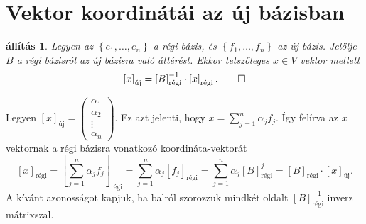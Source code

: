 \documentclass[9pt, a4paper, showtrims]{memoir}
\makeatletter
\renewenvironment{proof}[1][\proofname]
    {\par\pushQED{\qed}%
    \normalfont \topsep6\p@\@plus6\p@\relax
    \trivlist
    \item[\hskip\labelsep
        \itshape
    #1\@addpunct{:}]\ignorespaces}
    {\popQED\endtrivlist\@endpefalse}
\theoremstyle{plain}
\newtheorem{proposition}{állítás}[chapter]
\theoremstyle{remark}
\theoremstyle{definition}
\newcommand{\uj}{\text{új}}
\newcommand{\rgi}{\text{régi}}
\makeatother
\begin{document}
\section{Vektor koordinátái az új bázisban}
\begin{proposition}
	Legyen az $\left\{ e_1,\ldots,e_n \right\}$ a régi bázis,
	és $\left\{ f_1,\ldots,f_n \right\}$ az új bázis.
	Jelölje $B$ a régi bázisról az új bázisra való áttérést.
	Ekkor tetszőleges $x\in V$ vektor mellett
	\[
		\left[ x \right]_\uj
		=
		\left[ B \right]_\rgi^{-1}
		\cdot
		\left[ x \right]_\rgi.\qedhere
	\]
\end{proposition}
\begin{proof}
	Legyen
	$
		\left[ x \right]_\uj
		=
		\begin{pmatrix}
			\alpha_1 \\ \alpha_2 \\ \vdots \\ \alpha_n
		\end{pmatrix}.
	$
	Ez azt jelenti, hogy $x=\sum_{j=1}^n\alpha_jf_j$.
	Így felírva az $x$ vektornak a régi bázisra vonatkozó koordináta-vektorát
	\[
		\left[ x \right]_\rgi
		=\left[ \sum_{j=1}^n\alpha_jf_j \right]_\rgi
		=\sum_{j=1}^n\alpha_j\left[ f_j \right]_\rgi
		=\sum_{j=1}^n\alpha_j\left[ B \right]_\rgi^j
		=\left[ B \right]_\rgi\cdot \left[ x \right]_\uj.
	\]
	A kívánt azonosságot kapjuk,
	ha balról szorozzuk mindkét oldalt $\left[ B \right]^{-1}_\rgi$ inverz mátrixszal.
\end{proof}
\end{document}
